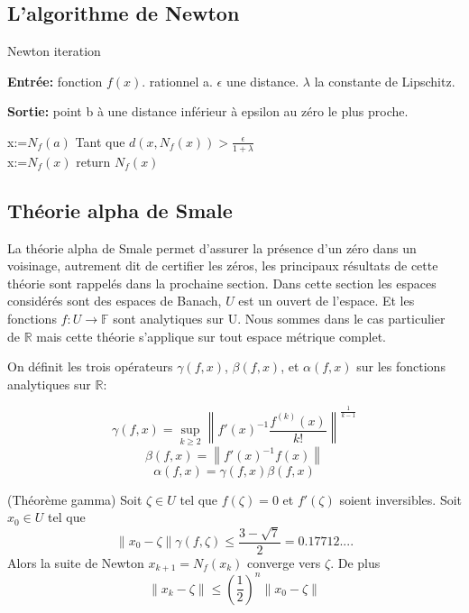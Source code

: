 \documentclass[a4paper,10.5pt]{article}
\begin{document}
	\subsection{L'algorithme de Newton}
	
	
	
	\begin{algorithm}
		\caption{Newton iteration}
		
		\vspace{2mm}
		
		\textbf{Entrée:} fonction $f(x)$. rationnel a. $\epsilon$ une distance. $\lambda$ la constante de Lipschitz.
		
		\textbf{Sortie:} point b à une distance inférieur à epsilon au zéro le plus proche. 
		
		\begin{algorithmic}[1]
			\STATE x:=$N_{f}(a)$
			\STATE Tant que $d(x,N_{f}(x))>\frac{\epsilon}{1+\lambda}$\\
					x:=$N_{f}(x)$					
			\STATE return $N_{f}(x)$
		\end{algorithmic}
	\end{algorithm}

	\subsection{Théorie alpha de Smale}
	La théorie alpha de Smale permet d'assurer la présence d'un zéro dans un voisinage, autrement dit de certifier les zéros, les principaux résultats de cette théorie sont rappelés dans la prochaine section.
	Dans cette section les espaces considérés sont des espaces de Banach, $U$ est un ouvert de l'espace. Et les fonctions $f:U\rightarrow \mathbb{F}$ sont analytiques sur U. Nous sommes dans le cas particulier de $\mathbb{R}$ mais cette théorie s'applique sur tout espace métrique complet. 
	
	\begin{definition}
		
		On définit les trois opérateurs $\gamma(f,x)$, $\beta(f,x)$, et $\alpha(f,x)$ sur les fonctions analytiques sur $\mathbb{R}$:
		
		\[\gamma(f,x)=\sup_{k \geq 2}\left\|f'(x)^{-1}\frac{f^{(k)}(x)}{k!}\right\|^{\frac{1}{k-1}}\]
		\[\beta(f,x)=\left\|f'(x)^{-1}f(x)\right\|\]
		\[\alpha(f,x)=\gamma(f,x)\beta(f,x)\]
	\end{definition}
	
	\begin{theorem}(Théorème gamma) Soit $\zeta \in U$ tel que $f(\zeta)=0$ et $f'(\zeta)$ soient inversibles. Soit $x_{0} \in U$ tel que \\
		\[\left\|x_{0}-\zeta\right\|\gamma(f,\zeta) \leq \frac{3-\sqrt{7}}{2}=0.17712.... \]
		Alors la suite de Newton $x_{k+1}=N_{f}(x_{k})$ converge vers $\zeta$. De plus\\
		\[\left\|x_{k}-\zeta\right\| \leq \left(\frac{1}{2}\right)^{n}\left\|x_{0}-\zeta\right\|\]
	\end{theorem}
	
\end{document}
